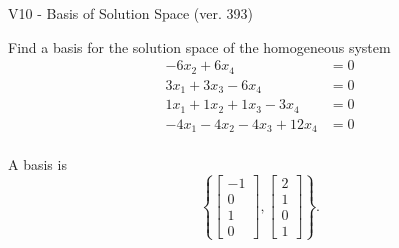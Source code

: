 \begin{exercise}
  \begin{exerciseTitle}V10 - Basis of Solution Space (ver. 393)\end{exerciseTitle}
  \begin{exerciseStatement}
    Find a basis for the solution space of the homogeneous system 
\begin{align*}
 -6 x_ 2 + 6 x_ 4 &= 0  \\ 
  3 x_ 1 + 3 x_ 3 -6 x_ 4 &= 0  \\ 
  1 x_ 1 + 1 x_ 2 + 1 x_ 3 -3 x_ 4 &= 0  \\ 
  -4 x_ 1 -4 x_ 2 -4 x_ 3 + 12 x_ 4 &= 0  \\ 
 \end{align*}


 
  \end{exerciseStatement}

  \begin{exerciseAnswer}
   A basis is   
\[\left\{\left[\begin{array}{c}
-1 \\
0 \\
1 \\
0
\end{array}\right] , \left[\begin{array}{c}
2 \\
1 \\
0 \\
1
\end{array}\right]\right\}.\]

  


  \end{exerciseAnswer}
\end{exercise}